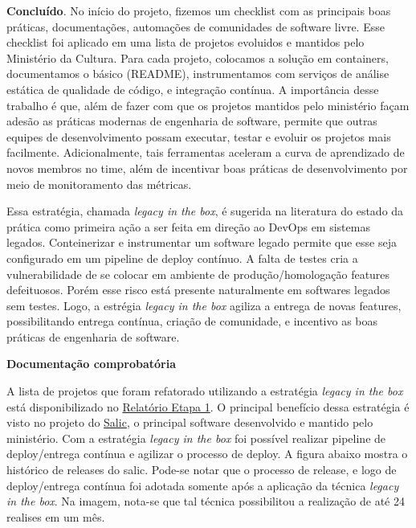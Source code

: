 \textbf{Concluído}. No início do projeto, fizemos um checklist com as
principais boas práticas, documentações, automações de comunidades de
software livre. Esse checklist foi aplicado em uma lista de projetos
evoluidos e mantidos pelo Ministério da Cultura. Para cada projeto,
colocamos a solução em containers, documentamos o básico (README),
instrumentamos com serviços de análise estática de qualidade de código,
e integração contínua. A importância desse trabalho é que, além de fazer
com que os projetos mantidos pelo ministério façam adesão as práticas
modernas de engenharia de software, permite que outras equipes de
desenvolvimento possam executar, testar e evoluir os projetos mais
facilmente. Adicionalmente, tais ferramentas aceleram a curva de
aprendizado de novos membros no time, além de incentivar boas práticas
de desenvolvimento por meio de monitoramento das métricas.

Essa estratégia, chamada \emph{legacy in the box}, é sugerida na
literatura do estado da prática como primeira ação a ser feita em
direção ao DevOps em sistemas legados. Conteinerizar e instrumentar um
software legado permite que esse seja configurado em um pipeline de
deploy contínuo. A falta de testes cria a vulnerabilidade de se colocar
em ambiente de produção/homologação features defeituosos. Porém esse
risco está presente naturalmente em softwares legados sem testes. Logo,
a estrégia \emph{legacy in the box} agiliza a entrega de novas features,
possibilitando entrega contínua, criação de comunidade, e incentivo as
boas práticas de engenharia de software.

\textbf{Documentação comprobatória}

A lista de projetos que foram refatorado utilizando a estratégia
\emph{legacy in the box} está disponibilizado no
\href{https://github.com/lappis-unb/EcossistemasSWLivre/blob/master/Relatorios/R1/RELATÓRIO\%20ETAPA\%201.pdf}{Relatório
Etapa 1}. O principal benefício dessa estratégia é visto no projeto do
\href{https://github.com/culturagovbr/salic-minc}{Salic}, o principal
software desenvolvido e mantido pelo ministério. Com a estratégia
\emph{legacy in the box} foi possível realizar pipeline de
deploy/entrega contínua e agilizar o processo de deploy. A figura abaixo
mostra o histórico de releases do salic. Pode-se notar que o processo de
release, e logo de deploy/entrega contínua foi adotada somente após a
aplicação da técnica \emph{legacy in the box}. Na imagem, nota-se que
tal técnica possibilitou a realização de até 24 realises em um mês.

